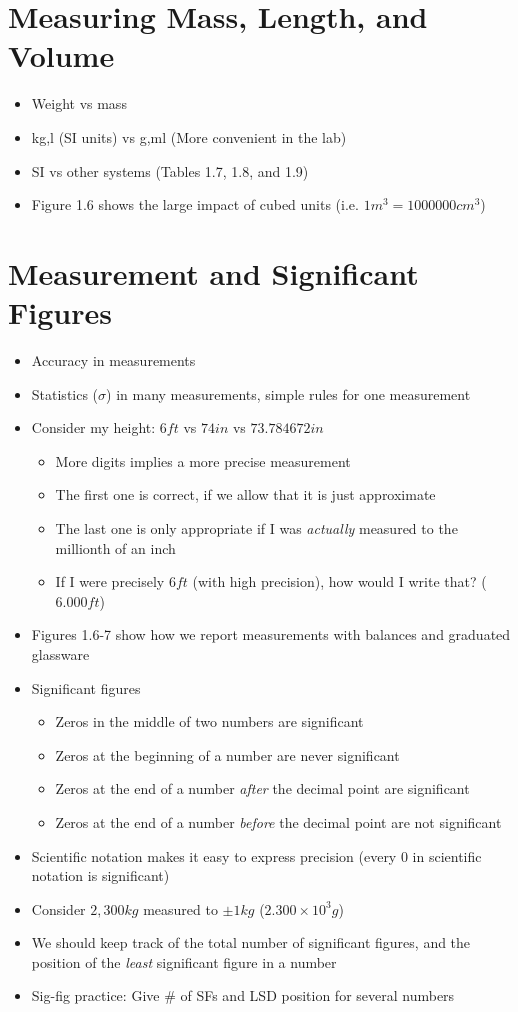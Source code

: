 \documentclass[12pt, openany, letterpaper]{memoir}
\begin{document}
\section{Measuring Mass, Length, and Volume}
\begin{itemize}
	\item Weight vs mass
	\item kg,l (SI units) vs g,ml (More convenient in the lab)
	\item SI vs other systems (Tables 1.7, 1.8, and 1.9)
  \item Figure 1.6 shows the large impact of cubed units (i.e. $1m^3 = 1000000cm^3$) 
\end{itemize}

\section{Measurement and Significant Figures}
\begin{itemize}
	\item Accuracy in measurements
	\item Statistics ($\sigma$) in many measurements, simple rules for one measurement
	\item Consider my height: $6ft$ vs $74in$ vs $73.784672in$
	\begin{itemize}
		\item More digits implies a more precise measurement
		\item The first one is correct, if we allow that it is just approximate
		\item The last one is only appropriate if I was \emph{actually} measured to the millionth of an inch
		\item If I were precisely $6ft$ (with high precision), how would I write that? ($6.000ft$)
	\end{itemize} 
\item Figures 1.6-7 show how we report measurements with balances and graduated glassware
	\item Significant figures
	\begin{itemize}
		\item Zeros in the middle of two numbers are significant
		\item Zeros at the beginning of a number are never significant
		\item Zeros at the end of a number \emph{after} the decimal point are significant
		\item Zeros at the end of a number \emph{before} the decimal point are not significant
	\end{itemize}	
	\item Scientific notation makes it easy to express precision (every $0$ in scientific notation is significant)
	\item Consider $2,300kg$ measured to $\pm1kg$ ($2.300\times10^3g$)
	\item We should keep track of the total number of significant figures, and the position of the \emph{least} significant figure in a number
	\item Sig-fig practice: Give \# of SFs and LSD position for several numbers
\end{itemize}
\end{document}
